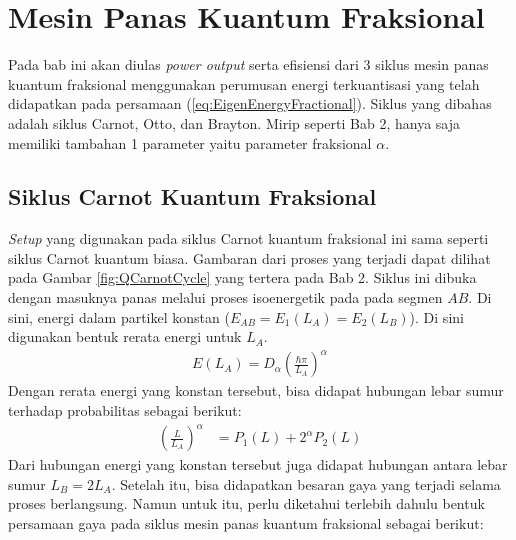 \chapter{Mesin Panas Kuantum Fraksional}

\par Pada bab ini akan diulas \textit{power output} serta efisiensi dari 3 siklus mesin panas kuantum fraksional menggunakan perumusan energi terkuantisasi yang telah didapatkan pada persamaan (\ref{eq:EigenEnergyFractional}). Siklus yang dibahas adalah siklus Carnot, Otto, dan Brayton. Mirip seperti Bab 2, hanya saja memiliki tambahan 1 parameter yaitu parameter fraksional \(\alpha\).

\section{Siklus Carnot Kuantum Fraksional}
\textit{Setup} yang digunakan pada siklus Carnot kuantum fraksional ini sama seperti siklus Carnot kuantum biasa. Gambaran dari proses yang terjadi dapat dilihat pada Gambar \ref{fig:QCarnotCycle} yang tertera pada Bab 2. Siklus ini dibuka dengan masuknya panas melalui proses isoenergetik pada pada segmen \(AB\). Di sini, energi dalam partikel konstan (\(E_{AB} = E_1(L_A) = E_2 (L_B)\)). Di sini digunakan bentuk rerata energi untuk \(L_A\).
\begin{align}
    E(L_A) = D_\alpha \left(\frac{\hbar\pi}{L_A}\right)^\alpha
\end{align}
Dengan rerata energi yang konstan tersebut, bisa didapat hubungan lebar sumur terhadap probabilitas sebagai berikut:
\begin{align}
    \left(\frac{L}{L_A}\right)^\alpha &= P_1(L) + 2^\alpha P_2(L)
\end{align}
Dari hubungan energi yang konstan tersebut juga didapat hubungan antara lebar sumur \(L_B = 2L_A\). Setelah itu, bisa didapatkan besaran gaya yang terjadi selama proses berlangsung. Namun untuk itu, perlu diketahui terlebih dahulu bentuk persamaan gaya pada siklus mesin panas kuantum fraksional sebagai berikut:
